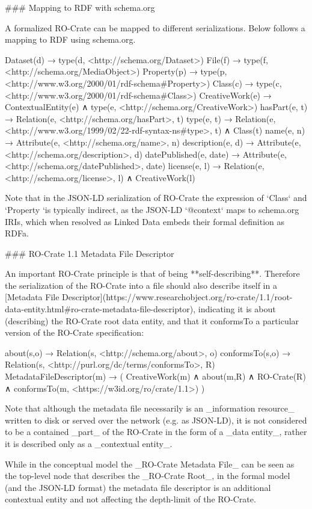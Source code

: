 ### Mapping to RDF with schema.org

A formalized RO-Crate can be mapped to different serializations. Below follows a mapping to RDF using schema.org.

    Dataset(d) →  type(d, <http://schema.org/Dataset>)
    File(f) →  type(f, <http://schema.org/MediaObject>)
    Property(p) →  type(p, <http://www.w3.org/2000/01/rdf-schema#Property>)
    Class(c) →  type(c, <http://www.w3.org/2000/01/rdf-schema#Class>)
    CreativeWork(e) →  ContextualEntity(e) ∧ type(e, <http://schema.org/CreativeWork>)
    hasPart(e, t) →  Relation(e, <http://schema.org/hasPart>, t)
    type(e, t) →  Relation(e, <http://www.w3.org/1999/02/22-rdf-syntax-ns#type>, t) ∧ Class(t)
    name(e, n) →  Attribute(e, <http://schema.org/name>, n)
    description(e, d) →  Attribute(e, <http://schema.org/description>, d)
    datePublished(e, date) →  Attribute(e, <http://schema.org/datePublished>, date)
    license(e, l) →  Relation(e, <http://schema.org/license>, l) ∧ CreativeWork(l)

Note that in the JSON-LD serialization of RO-Crate the expression of `Class` and `Property `is typically indirect, as the JSON-LD `@context` maps to schema.org IRIs, which when resolved as Linked Data embeds their formal definition as RDFa. 


### RO-Crate 1.1 Metadata File Descriptor

An important RO-Crate principle is that of being **self-describing**. Therefore the serialization of the RO-Crate into a file should also describe itself in a [Metadata File Descriptor](https://www.researchobject.org/ro-crate/1.1/root-data-entity.html#ro-crate-metadata-file-descriptor), indicating it is about (describing) the RO-Crate root data entity, and that it conformsTo a particular version of the RO-Crate specification:

    about(s,o) →  Relation(s, <http://schema.org/about>, o)
    conformsTo(s,o) →  Relation(s, <http://purl.org/dc/terms/conformsTo>, R)
    MetadataFileDescriptor(m) →  ( CreativeWork(m) ∧ about(m,R) ∧ RO-Crate(R) ∧ 
        conformsTo(m, <https://w3id.org/ro/crate/1.1>) )

Note that although the metadata file necessarily is an _information resource_ written to disk or served over the network (e.g. as JSON-LD), it is not considered to be a contained _part_ of the RO-Crate in the form of a _data entity_, rather it is described only as a _contextual entity_.

While in the conceptual model the _RO-Crate Metadata File_ can be seen as the top-level node that describes the _RO-Crate Root_, in the formal model (and the JSON-LD format) the metadata file descriptor is an additional contextual entity and not affecting the depth-limit of the RO-Crate.


